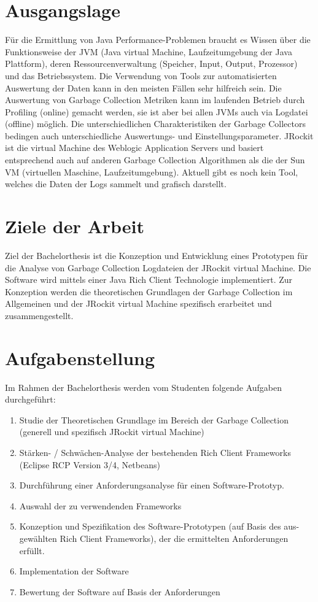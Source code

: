 \section{Ausgangslage}
Für die Ermittlung von Java Performance-Problemen braucht es Wissen über die Funktionsweise der JVM (Java virtual Machine, Laufzeitumgebung der Java Plattform), deren Ressourcenverwaltung (Speicher, Input, Output, Prozessor) und das Betriebssystem. Die Verwendung von Tools zur automatisierten Auswertung der Daten kann in den meisten Fällen sehr hilfreich sein. 
Die Auswertung von Garbage Collection Metriken kann im laufenden Betrieb durch Profiling (online) gemacht werden, sie ist aber bei allen JVMs auch via Logdatei (offline) möglich. Die unterschiedlichen Charakteristiken der Garbage Collectors bedingen auch unterschiedliche Auswertungs- und Einstellungsparameter. 
JRockit ist die virtual Machine des Weblogic Application Servers und basiert entsprechend auch auf anderen Garbage Collection Algorithmen als die der Sun VM (virtuellen Maschine, Laufzeitumgebung). Aktuell gibt es noch kein Tool, welches die Daten der Logs sammelt und grafisch darstellt.


\section{Ziele der Arbeit}
Ziel der Bachelorthesis ist die Konzeption und Entwicklung eines Prototypen für die Analyse von Garbage Collection Logdateien der JRockit virtual Machine. Die Software wird mittels einer Java Rich Client Technologie implementiert. Zur Konzeption werden die theoretischen Grundlagen der Garbage Collection im Allgemeinen und der JRockit virtual Machine spezifisch erarbeitet und zusammengestellt.

\section{Aufgabenstellung}
Im Rahmen der Bachelorthesis werden vom Studenten folgende Aufgaben durchgeführt:

\begin{enumerate}
\item Studie der Theoretischen Grundlage im Bereich der Garbage Collection 
    (generell und spezifisch JRockit virtual Machine)
\item Stärken- / Schwächen-Analyse der bestehenden Rich Client Frameworks
    (Eclipse RCP Version 3/4, Netbeans)
\item Durchführung einer Anforderungsanalyse für einen Software-Prototyp.
\item Auswahl der zu verwendenden Frameworks
\item Konzeption und Spezifikation des Software-Prototypen (auf Basis des aus-
    gewählten Rich Client Frameworks), der die ermittelten Anforderungen erfüllt.  
\item Implementation der Software
\item Bewertung der Software auf Basis der Anforderungen
\end{enumerate}

